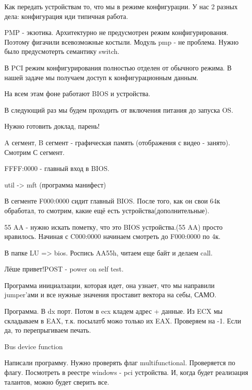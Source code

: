 Как передать устройствам то, что мы в режиме конфигурации. У нас 2 разных дела: конфигурация иди типичная работа. 

\begin{rem}
PMP - экзотика. Архитектурно не предусмотрен режим конфигурирования. Поэтому фигачили всевозможные костыли. Модуль pmp - не проблема. Нужно было предусмотерть семантику switch. 
 \end{rem}
 
В PCI режим конфигурирования полностью отделен от обычного режима. В нашей задаче мы получаем доступ к конфигурационным данным. 

На всем этам фоне работают BIOS и устройства.

В следующий раз мы будем проходить от включения питания до запуска OS.
\begin{hw}Нужно готовить доклад, парень!\end{hw}

A сегмент, B сегмент - графическая память (отображения с видео - занято). Смотрим С сегмент.

FFFF:0000 - главный вход в BIOS. 

util -> mft (программа манифест)

В сегменте F000:0000 сидит главный BIOS. После того, как он  свои 64к обработал, то смотрим, какие ещё есть устройства(дополнительные).

55 AA - нужно искать пометку, что это BIOS устройства.(55 AA) просто нравилось.
Начиная с C000:0000  начинаем смотреть до F000:0000 по 4к.


В папке LU => bios. Роспись AA55h, читаем еще байт и делаем call. 

\begin{rem}Лёше привет!POST - power on self test.
\end{rem}

Программа инициалзации, которая идет, она узнает, что мы направили jumper'ами и все нужные значения проставит вектора на себы, САМО. 

\newpage

Программа. В dx порт. Потом в ecx кладем адрес + данные. Из ECX мы складываем в EAX,  т.к. посылатб можо только их EAX. Проверяем на -1. Если да, то перепрыгиваем печать.

Bus device function

Написали программу.
Нужно проверять флаг multifunctional. Проверяется по флагу. Посмотреть в реестре windows - pci устройства. И, когда будет реализация талантов, можно будет сверить все.


